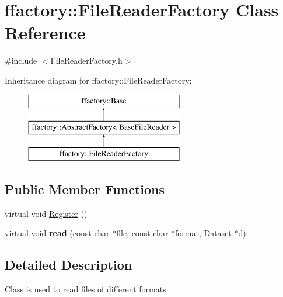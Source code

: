 \hypertarget{classffactory_1_1_file_reader_factory}{\section{ffactory\-:\-:File\-Reader\-Factory Class Reference}
\label{classffactory_1_1_file_reader_factory}
}


{\ttfamily \#include $<$File\-Reader\-Factory.\-h$>$}

Inheritance diagram for ffactory\-:\-:File\-Reader\-Factory\-:\begin{figure}[H]
\begin{center}
\leavevmode
\includegraphics[height=3.000000cm]{classffactory_1_1_file_reader_factory}
\end{center}
\end{figure}
\subsection*{Public Member Functions}
\begin{DoxyCompactItemize}
\item 
virtual void \hyperlink{classffactory_1_1_file_reader_factory_a0f0b807dc1c92452b1cb97187ddf9f33}{Register} ()
\item 
\hypertarget{classffactory_1_1_file_reader_factory_a7674c4a7bde811450a391792eecc8ff4}{virtual void {\bfseries read} (const char $\ast$file, const char $\ast$format, \hyperlink{classffactory_1_1_dataset}{Dataset} $\ast$d)}\label{classffactory_1_1_file_reader_factory_a7674c4a7bde811450a391792eecc8ff4}

\end{DoxyCompactItemize}


\subsection{Detailed Description}
Class is used to read files of different formats 

